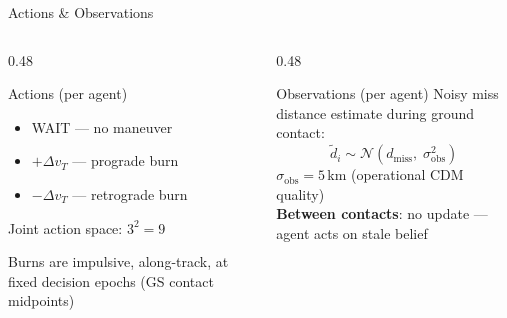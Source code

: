 \documentclass[aspectratio=169]{beamer}
\begin{document}
\begin{frame}{Actions \& Observations}
  \begin{columns}
    \begin{column}{0.48\textwidth}
      \begin{block}{Actions (per agent)}
        \begin{itemize}
          \item WAIT --- no maneuver
          \item $+\Delta v_T$ --- prograde burn
          \item $-\Delta v_T$ --- retrograde burn
        \end{itemize}
        Joint action space: $3^2 = 9$
      \end{block}
      \vspace{0.5em}
      Burns are impulsive, along-track, at fixed decision epochs (GS contact midpoints)
    \end{column}
    \begin{column}{0.48\textwidth}
      \begin{block}{Observations (per agent)}
        Noisy miss distance estimate during ground contact:
        \[
          \tilde{d}_i \sim \mathcal{N}(d_\text{miss},\; \sigma_\text{obs}^2)
        \]
        $\sigma_\text{obs} = 5$\,km (operational CDM quality)\\[0.5em]
        \textbf{Between contacts}: no update --- agent acts on stale belief
      \end{block}
    \end{column}
  \end{columns}
\end{frame}
\end{document}

